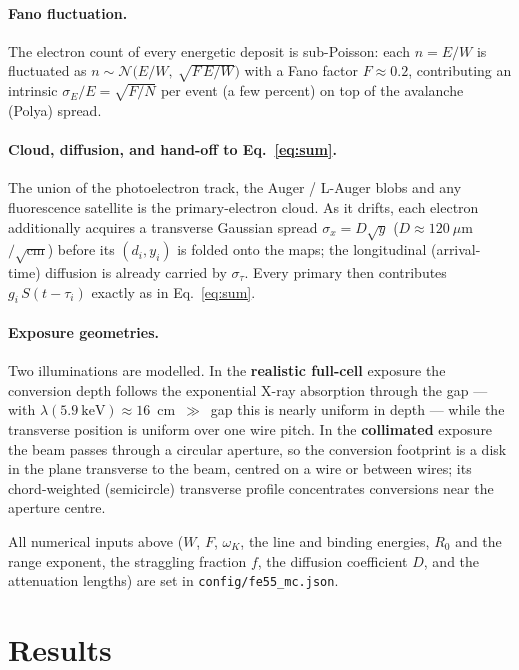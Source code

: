 \documentclass[11pt,a4paper]{article}
\begin{document}
\paragraph{Fano fluctuation.} The electron count of every energetic deposit is sub-Poisson: each
$n=E/W$ is fluctuated as $n\sim\mathcal{N}\!\big(E/W,\ \sqrt{F\,E/W}\big)$ with a Fano factor
$F\approx0.2$, contributing an intrinsic $\sigma_E/E=\sqrt{F/N}$ per event (a few percent) on top of the
avalanche (Polya) spread.

\paragraph{Cloud, diffusion, and hand-off to Eq.~\eqref{eq:sum}.} The union of the photoelectron track,
the Auger / L-Auger blobs and any fluorescence satellite is the primary-electron cloud. As it drifts,
each electron additionally acquires a transverse Gaussian spread $\sigma_x=D\sqrt{y}$
($D\approx120~\mu$m$/\sqrt{\text{cm}}$) before its $(d_i,y_i)$ is folded onto the maps; the longitudinal
(arrival-time) diffusion is already carried by $\sigma_\tau$. Every primary then contributes
$g_i\,S(t-\tau_i)$ exactly as in Eq.~\eqref{eq:sum}.

\paragraph{Exposure geometries.} Two illuminations are modelled. In the \textbf{realistic full-cell}
exposure the conversion depth follows the exponential X-ray absorption through the gap --- with
$\lambda(5.9~\text{keV})\approx16$~cm~$\gg$~gap this is nearly uniform in depth --- while the transverse
position is uniform over one wire pitch. In the \textbf{collimated} exposure the beam passes through a
circular aperture, so the conversion footprint is a disk in the plane transverse to the beam, centred on
a wire or between wires; its chord-weighted (semicircle) transverse profile concentrates conversions
near the aperture centre.

All numerical inputs above ($W$, $F$, $\omega_K$, the line and binding energies, $R_0$ and the range
exponent, the straggling fraction $f$, the diffusion coefficient $D$, and the attenuation lengths) are
set in \texttt{config/fe55\_mc.json}.

\clearpage
\section{Results}
\end{document}
